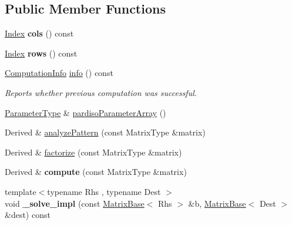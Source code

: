 \subsection*{Public Member Functions}
\begin{DoxyCompactItemize}
\item 
\mbox{\label{class_eigen_1_1_pardiso_impl_a52a56fde447df457c27f808ae81857a6}} 
\hyperlink{namespace_eigen_a62e77e0933482dafde8fe197d9a2cfde}{Index} {\bfseries cols} () const
\item 
\mbox{\label{class_eigen_1_1_pardiso_impl_a4da5aaafb4964daee9855b897ebc3a4b}} 
\hyperlink{namespace_eigen_a62e77e0933482dafde8fe197d9a2cfde}{Index} {\bfseries rows} () const
\item 
\hyperlink{group__enums_ga85fad7b87587764e5cf6b513a9e0ee5e}{Computation\+Info} \hyperlink{class_eigen_1_1_pardiso_impl_a7dce1175518593e33d32e30ab0ffee3b}{info} () const
\begin{DoxyCompactList}\small\item\em Reports whether previous computation was successful. \end{DoxyCompactList}\item 
\hyperlink{group___core___module}{Parameter\+Type} \& \hyperlink{class_eigen_1_1_pardiso_impl_a42a7983796076edc52e0e8d2869610ec}{pardiso\+Parameter\+Array} ()
\item 
Derived \& \hyperlink{class_eigen_1_1_pardiso_impl_af1773ce06014b55a69cd42daf34eeec4}{analyze\+Pattern} (const Matrix\+Type \&matrix)
\item 
Derived \& \hyperlink{class_eigen_1_1_pardiso_impl_a6a4c092c5fb581a946d3c4e5ec347dfb}{factorize} (const Matrix\+Type \&matrix)
\item 
\mbox{\label{class_eigen_1_1_pardiso_impl_a01d51b4c6a2aa4d269f77d9f12ab8c34}} 
Derived \& {\bfseries compute} (const Matrix\+Type \&matrix)
\item 
\mbox{\label{class_eigen_1_1_pardiso_impl_a1735d09abb438a282ddca4c5bd05d993}} 
{\footnotesize template$<$typename Rhs , typename Dest $>$ }\\void {\bfseries \+\_\+solve\+\_\+impl} (const \hyperlink{group___core___module_class_eigen_1_1_matrix_base}{Matrix\+Base}$<$ Rhs $>$ \&b, \hyperlink{group___core___module_class_eigen_1_1_matrix_base}{Matrix\+Base}$<$ Dest $>$ \&dest) const

\end{DoxyCompactItemize}

